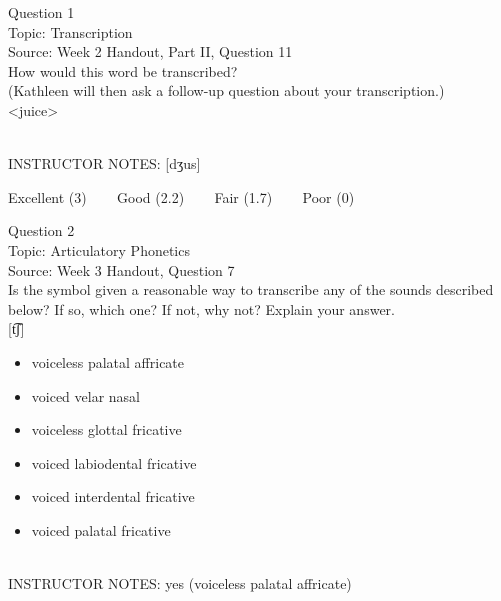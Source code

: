 \documentclass[12pt]{article}
\begin{document}
\begin{center}
\textbf{{\color{blue}{\HUGE START OF EXAM\\}}}

\textbf{{\color{blue}{\HUGE Student ID: 34812\\}}}

\textbf{{\color{blue}{\HUGE \\}}}

\end{center}
\newpage

{\large Question 1}\\

Topic: Transcription\\
Source: Week 2 Handout, Part II, Question 11\\

How would this word be transcribed?\\ (Kathleen will then ask a follow-up question about your transcription.)\\

<juice>


~\\
INSTRUCTOR NOTES: [dʒus]


\vfill
Excellent (3) ~~~ Good (2.2) ~~~ Fair (1.7) ~~~ Poor (0)
\newpage

{\large Question 2}\\

Topic: Articulatory Phonetics\\
Source: Week 3 Handout, Question 7\\

Is the symbol given a reasonable way to transcribe any of the sounds described below? If so, which one? If not, why not? Explain your answer.\\

{[t͡ʃ]}

\begin{itemize} \item voiceless palatal affricate \item voiced velar nasal \item voiceless glottal fricative \item voiced labiodental fricative \item voiced interdental fricative \item voiced palatal fricative \end{itemize}


~\\
INSTRUCTOR NOTES: yes (voiceless palatal affricate)
\end{document}
